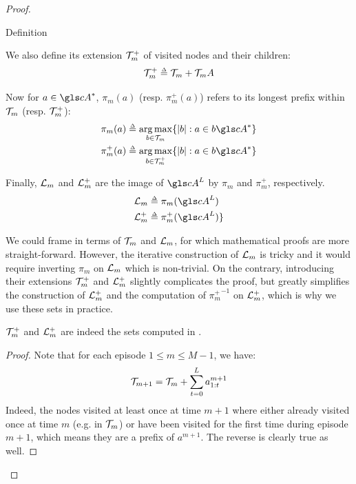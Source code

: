 \begin{subappendices}
\begin{proof}
\begin{paragraph}{Definition}
\begin{leftbar}[defnbar]
		We also define its extension $\mathcal{T}_m^+$ of visited nodes and their children:
		\begin{equation*}
		\Tau_m^+ \eqdef \Tau_m + \Tau_m A
		\end{equation*}
		
		Now for $a\in \cA^*$, $\pi_m(a)$ (resp. $\pi_m^+(a)$) refers to its longest prefix within $\mathcal{T}_m$ (resp. $\mathcal{T}_m^+$):
		\begin{align*}
		\pi_m(a) &\eqdef \argmax_{b\in\Tau_m} \{|b|: a\in b \cA^* \} \\
		\pi_m^+(a) &\eqdef \argmax_{b\in\Tau_m^+} \{|b|: a\in b \cA^* \}
		\end{align*}
		
		Finally, $\mathcal{L}_m$ and $\mathcal{L}_m^+$ are the image of $\cA^L$ by $\pi_m$ and $\pi_m^+$, respectively.
		\begin{align*}
		\LL_m &\eqdef \pi_m(\cA^L) \\
		\LL_m^+ &\eqdef \pi_m^+(\cA^L) \}
		\end{align*}
		\end{leftbar}
	\end{paragraph}
	
	\begin{remark}
		\begin{leftbar}[remarkbar]
		We could frame  in terms of $\mathcal{T}_m$ and $\mathcal{L}_m$, for which mathematical proofs are more straight-forward. However, the iterative construction of $\mathcal{L}_m$ is tricky and it would require inverting $\pi_m$ on $\mathcal{L}_m$ which is non-trivial. On the contrary, introducing their extensions  $\mathcal{T}_m^+$ and $\mathcal{L}_m^+$ slightly complicates the proof, but greatly simplifies the construction of $\mathcal{L}_m^+$ and the computation of ${\pi_m^+}^{-1}$ on $\mathcal{L}_m^+$, which is why we use these sets in practice.
		\end{leftbar}
	\end{remark}
	
	\begin{lemma}
		\begin{leftbar}[lemmabar]
		$\mathcal{T}_m^+$ and $\mathcal{L}_m^+$ are indeed the sets computed in .
		\end{leftbar}
	\end{lemma}
	\begin{proof}
		Note that for each episode $1 \leq m \leq M - 1$, we have:
		\begin{equation}
		\label{eq:tau_mp1}
		\mathcal{T}_{m+1} = \mathcal{T}_{m} + \sum_{t=0}^L a^{m+1}_{1:t}
		\end{equation}
		Indeed, the nodes visited at least once at time $m+1$ where either already visited once at time $m$ (e.g. in $\mathcal{T}_{m}$) or have been visited for the first time during episode $m+1$, which means they are a prefix of $a^{m+1}$. The reverse is clearly true as well.
		

\end{proof}
\end{proof}
\end{subappendices}
